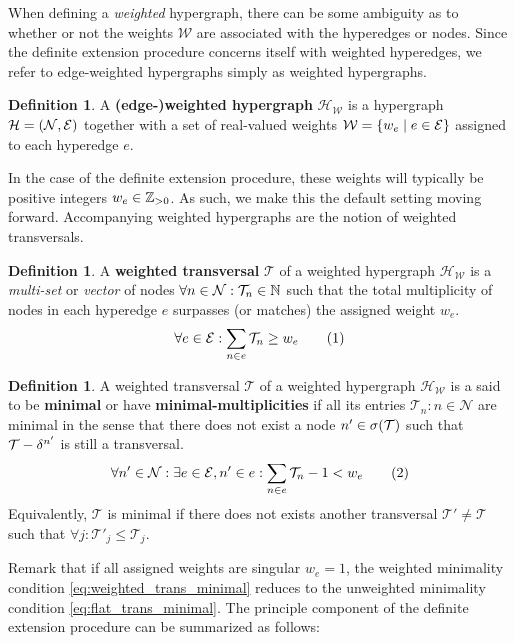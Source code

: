 \documentclass[aps, 10pt, english, twoside, pra, nofootinbib, longbibliography]{revtex4-1}
\theoremstyle{plain}
\theoremstyle{definition}
\newtheorem{definition}[theorem]{Definition}
\theoremstyle{remark}
\newcommand{\hgraph}{\mathcal{H}}
\newcommand{\nodes}{\mathcal{N}}
\newcommand{\weights}{\mathcal{W}}
\newcommand{\edges}{\mathcal{E}}
\newcommand{\trans}{\mathcal{T}}
\newcommand{\supp}[1]{\si\br{#1}}
\newcommand{\term}[1]{\textcolor{Mahogany}{\textbf{#1}}}
\begin{document}
    When defining a \textit{weighted} hypergraph, there can be some ambiguity as to whether or not the weights $\weights$ are associated with the hyperedges or nodes. Since the definite extension procedure concerns itself with weighted hyperedges, we refer to edge-weighted hypergraphs simply as weighted hypergraphs.
    \begin{definition}
        A \term{(edge-)weighted hypergraph} $\hgraph_\weights$ is a hypergraph $\hgraph = \br{\nodes, \edges}$ together with a set of real-valued weights $\weights = \bc{w_e \mid e \in \edges}$ assigned to each hyperedge $e$.
    \end{definition}
    In the case of the definite extension procedure, these weights will typically be positive integers $w_e \in {\mathbb{Z}}_{> 0}$. As such, we make this the default setting moving forward. Accompanying weighted hypergraphs are the notion of weighted transversals.
    \begin{definition}
        A \term{weighted transversal} $\trans$ of a weighted hypergraph $\hgraph_{\weights}$ is a \textit{multi-set} or \textit{vector} of nodes $\forall n \in \nodes : \trans_n \in \N$ such that the total multiplicity of nodes in each hyperedge $e$ surpasses (or matches) the assigned weight $w_e$.
        \[ \forall e \in \edges : \sum_{n \in e} \trans_{n} \geq w_e \eq \label{eq:weighted_trans_def}\]
    \end{definition}
    \begin{definition}
        A weighted transversal $\trans$ of a weighted hypergraph $\hgraph_{\weights}$ is a said to be \term{minimal} or have \term{minimal-multiplicities} if all its entries $\trans_n : n \in \nodes$ are minimal in the sense that there does not exist a node $n' \in \supp{\trans}$ such that $\trans - \de^{n'}$ is still a transversal.
        \[ \forall n' \in \nodes : \exists e \in \edges, n' \in e : \sum_{n \in e} \trans_{n} - 1 < w_e  \eq \label{eq:weighted_trans_minimal}\]
        Equivalently, $\trans$ is minimal if there does not exists another transversal $\trans' \neq \trans$ such that $\forall j : \trans'_j \leq \trans_j$.
    \end{definition}
    Remark that if all assigned weights are singular $w_e = 1$, the weighted minimality condition \cref{eq:weighted_trans_minimal} reduces to the unweighted minimality condition \cref{eq:flat_trans_minimal}. The principle component of the definite extension procedure can be summarized as follows:
\end{document}
